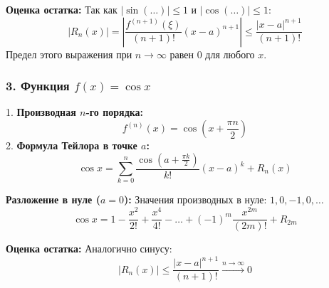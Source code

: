\textbf{Оценка остатка:}
Так как $|\sin(\dots)| \le 1$ и $|\cos(\dots)| \le 1$:
\[ |R_n(x)| = \left| \frac{f^{(n+1)}(\xi)}{(n+1)!}(x-a)^{n+1} \right| \le \frac{|x-a|^{n+1}}{(n+1)!} \]
Предел этого выражения при $n \to \infty$ равен 0 для любого $x$.

\subsubsection*{3. Функция $f(x) = \cos x$}

1.  \textbf{Производная $n$-го порядка:}
    \[ f^{(n)}(x) = \cos\left(x + \frac{\pi n}{2}\right) \]
2.  \textbf{Формула Тейлора в точке $a$:}
    \[ \cos x = \sum_{k=0}^n \frac{\cos(a + \frac{\pi k}{2})}{k!} (x-a)^k + R_n(x) \]

    \textbf{Разложение в нуле ($a=0$):}
    Значения производных в нуле: $1, 0, -1, 0, \dots$
    \[ \cos x = 1 - \frac{x^2}{2!} + \frac{x^4}{4!} - \dots + (-1)^m \frac{x^{2m}}{(2m)!} + R_{2m} \]

\textbf{Оценка остатка:}
Аналогично синусу:
\[ |R_n(x)| \le \frac{|x-a|^{n+1}}{(n+1)!} \xrightarrow{n \to \infty} 0 \]
